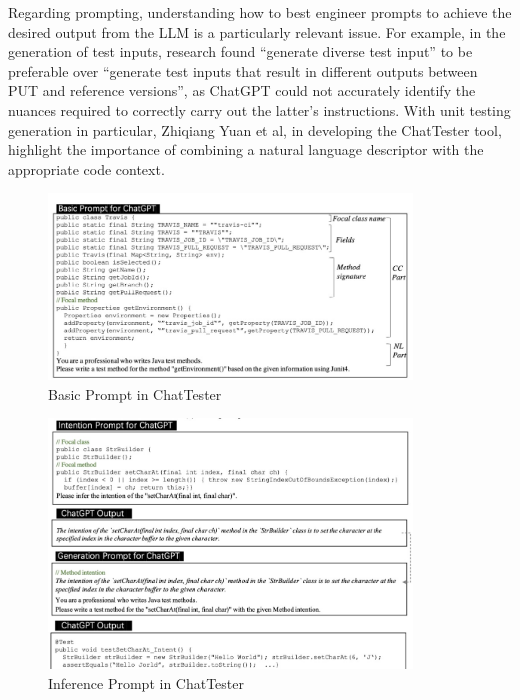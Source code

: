 Regarding prompting, understanding how to best engineer prompts to achieve the desired output from the LLM is a particularly relevant issue. For example, in the generation of test inputs, research found “generate diverse test input” to be preferable over “generate test inputs that result in different outputs between PUT and reference versions”, as ChatGPT could not accurately identify the nuances required to correctly carry out the latter's instructions. \citep{kn:nuances}
With unit testing generation in particular, Zhiqiang Yuan et al, in developing the ChatTester tool, highlight the importance of combining a natural language descriptor with the appropriate code context. \citep{kn:chattester}
\begin{figure}[!h]
    \includegraphics[width=0.86\textwidth]{figures/basicprompt.jpg}
    \caption{Basic Prompt in ChatTester}
    \label{fig:arch}
\end{figure}
\begin{figure}[!h]
    \includegraphics[width=0.86\textwidth]{figures/inferenceprompt.jpg}
    \caption{Inference Prompt in ChatTester}
    \label{fig:arch}
\end{figure}

